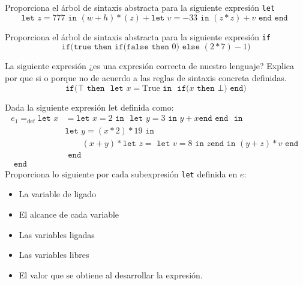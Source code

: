 \bigskip
    \begin{exercise}
        Proporciona el árbol de sintaxis abstracta para la siguiente expresión \texttt{let}
        \[ 
            \texttt{let } z = 777 \texttt{ in } (w + h) * (z) + \texttt{let } v = -33 \texttt{ in } (z * z) + v \texttt{ end } \texttt{end } 
        \]
    \end{exercise}

    \bigskip
    
    \begin{exercise}
        Proporciona el árbol de sintaxis abstracta para la siguiente expresión \texttt{if}
        \[
            \texttt{if(} \texttt{true} \texttt{ then } \texttt{if(}  \texttt{false} \texttt{ then } 0) \texttt{ else } (2 * 7) - 1 \texttt{)}
        \]
    \end{exercise}

    \bigskip
    
    \begin{exercise}
        La siguiente expresión ¿es una expresión correcta de nuestro lenguaje? Explica por que si o porque no de acuerdo a las reglas de sintaxis concreta definidas.
        \[
            \texttt{if(} \top \texttt{ then } \texttt{ let } x = \text{True} \texttt{ in } \texttt{ if(} x \texttt{ then } \bot \texttt{)} \texttt{ end} \text{)}
        \]
    \end{exercise}

    \bigskip
    
    \begin{exercise}
        Dada la siguiente expresión let definida como:
        \begin{align*}
        	e_1=_{\text{def}}\texttt{let  }
        		x&= \texttt{let }x = 2 \texttt{ in } \texttt{ let } y = 3 \texttt{ in } y + x \texttt{end } \texttt{end }
        		\texttt{ in }\\
        		 &\texttt{let }y=(x \ast 2) \ast 19 
        		 	\texttt{ in } \\
        		 & \qquad(x + y) \ast \texttt{let } z = \texttt{ let } v = 8 \texttt{ in } z \texttt{end} \texttt{ in } 
        		 						(y + z) \ast v 
        		 				\texttt{ end }\\
        		 &\texttt{ end }\\
        	\texttt{ end }&
        \end{align*}
        Proporciona lo siguiente por cada subexpresión \texttt{let} definida en $e$:
        \begin{itemize}
	 \item La variable de ligado
            \item El alcance de cada variable
            \item Las variables ligadas
	 \item Las variables libres
            \item El valor que se obtiene al desarrollar la expresión.
        \end{itemize}
    \end{exercise}

